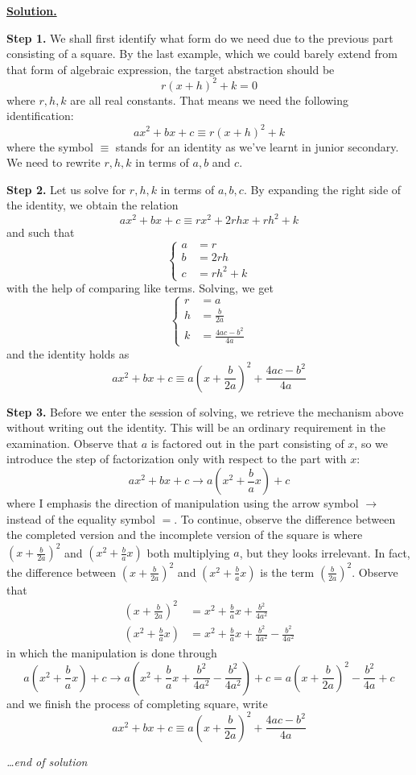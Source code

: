 \documentclass[12pt]{article}
\newenvironment{solution}{\begin{snugshade*} \underline{\textbf{Solution.}} \par}{\hfill \textit{\dots end of solution} \end{snugshade*}}
\begin{document}
    \begin{solution}
        \textbf{Step 1.} We shall first identify what form do we need due to the previous part consisting of a square. By the last example, which we could barely extend from that form of algebraic expression, the target abstraction should be $$r(x+h)^2+k=0$$ where $r,h,k$ are all real constants. That means we need the following identification: $$ax^2+bx+c\equiv r(x+h)^2+k$$ where the symbol $\equiv$ stands for an identity as we've learnt in junior secondary. We need to rewrite $r,h,k$ in terms of $a,b$ and $c$.

        \textbf{Step 2.} Let us solve for $r,h,k$ in terms of $a,b,c$. By expanding the right side of the identity, we obtain the relation $$ax^2+bx+c\equiv rx^2+2rhx+rh^2+k$$ and such that $$\begin{cases}
            a&=r\\
            b&=2rh\\
            c&=rh^2+k
        \end{cases}$$ with the help of comparing like terms. Solving, we get $$\begin{cases}
            r&=a\\
            h&=\displaystyle \frac{b}{2a}\\
            k&=\displaystyle \frac{4ac-b^2}{4a}
        \end{cases}$$ and the identity holds as $$ax^2+bx+c\equiv a(x+\frac{b}{2a})^2+\frac{4ac-b^2}{4a}$$

        \textbf{Step 3.} Before we enter the session of solving, we retrieve the mechanism above without writing out the identity. This will be an ordinary requirement in the examination. Observe that $a$ is factored out in the part consisting of $x$, so we introduce the step of factorization only with respect to the part with $x$: $$ax^2+bx+c \to a(x^2+\frac{b}{a}x)+c$$ where I emphasis the direction of manipulation using the arrow symbol $\to$ instead of the equality symbol $=$. To continue, observe the difference between the completed version and the incomplete version of the square is where $(x+\frac{b}{2a})^2$ and $(x^2+\frac{b}{a}x)$ both multiplying $a$, but they looks irrelevant. In fact, the difference between $(x+\frac{b}{2a})^2$ and $(x^2+\frac{b}{a}x)$ is the term $(\frac{b}{2a})^2$. Observe that \begin{align*}
            (x+\frac{b}{2a})^2&=x^2+\frac{b}{a}x+\frac{b^2}{4a^2}\\
            (x^2+\frac{b}{a}x)&=x^2+\frac{b}{a}x+\frac{b^2}{4a^2}-\frac{b^2}{4a^2}
        \end{align*}
        in which the manipulation is done through $$a(x^2+\frac{b}{a}x)+c \to a(x^2+\frac{b}{a}x+\frac{b^2}{4a^2}-\frac{b^2}{4a^2})+c=a(x+\frac{b}{2a})^2-\frac{b^2}{4a}+c$$ and we finish the process of completing square, write $$ax^2+bx+c\equiv a(x+\frac{b}{2a})^2+\frac{4ac-b^2}{4a}$$


\end{solution}
\end{document}
